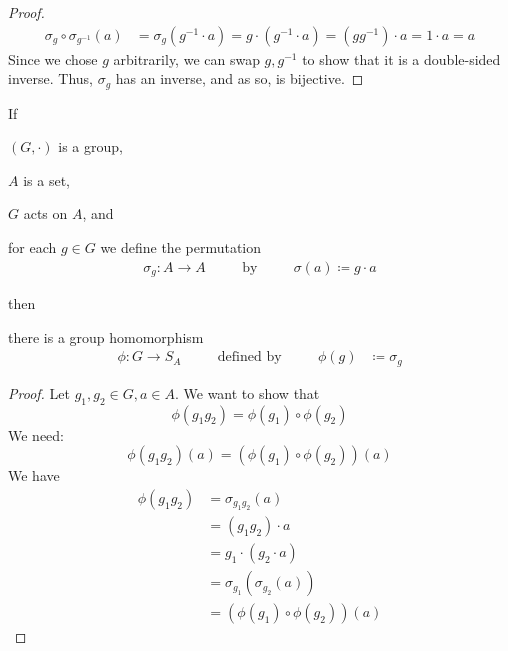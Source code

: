 \documentclass[a5paper]{article}
\begin{document}
\begin{proof}
  \begin{align*}
    \sigma_g\circ \sigma_{g^{-1}}(a) &= \sigma_g(g^{-1}\cdot a)
    = g\cdot(g^{-1}\cdot a)
    = (gg^{-1})\cdot a
    = 1\cdot a
    = a
  \end{align*}
  Since we chose $g$ arbitrarily, we can swap $g,g^{-1}$ to show that it is a
  double-sided inverse. Thus, $\sigma_g$ has an inverse, and as so, is bijective.
\end{proof}

\begin{theorem}
  If
  \begin{premises}
    \item $(G,\cdot)$ is a group,
    \item $A$ is a set,
    \item $G$ acts on $A$, and
    \item for each $g\in G$ we define the permutation
      \begin{align*}
        \sigma_g:A\longrightarrow A
        &&\quad\text{by}\quad&&\sigma(a)\coloneqq g\cdot a
      \end{align*}
  \end{premises}
  then
  \begin{conclusion}
    there is a group homomorphism
    \begin{align*}
      \phi:G\longrightarrow S_A &&\quad\text{defined by}\quad&& 
      \phi(g)&\coloneqq \sigma_g
    \end{align*}
  \end{conclusion}
\end{theorem}

\begin{proof}
  Let $g_1,g_2\in G,a\in A$. We want to show that
  \begin{equation*}
    \phi(g_1g_2)=\phi(g_1)\circ \phi(g_2)
  \end{equation*}
  We need:
  \begin{equation*}
    \phi(g_1g_2)(a)=(\phi(g_1)\circ \phi(g_2))(a)
  \end{equation*}
  We have
  \begin{align*}
    \phi(g_1g_2) &= \sigma_{g_1g_2}(a) \\
    &= (g_1g_2)\cdot a \\
    &= g_1\cdot (g_2\cdot a) \\
    &= \sigma_{g_1}(\sigma_{g_2}(a)) \\
    &= (\phi(g_1)\circ \phi(g_2))(a)
  \end{align*}
\end{proof}
\end{document}
